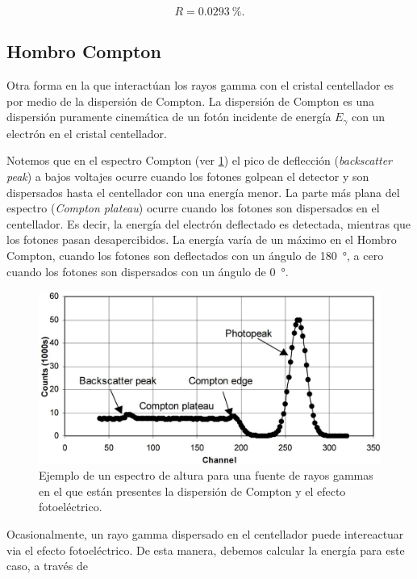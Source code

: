 \documentclass[12pt]{article}
\begin{document}
    \begin{equation*}
        R = \qty{0.0293}{\percent}.
    \end{equation*}

    \subsection*{Hombro Compton}

    Otra forma en la que interactúan los rayos gamma con el cristal centellador es por medio de la dispersión de Compton. La dispersión de Compton es una dispersión puramente cinemática de un fotón incidente de energía \(E_{\gamma}\) con un electrón en el cristal centellador.

    Notemos que en el espectro Compton (ver \cref{fig:comptonSpectrum}) el pico de deflección (\emph{backscatter peak}) a bajos voltajes ocurre cuando los fotones golpean el detector y son dispersados hasta el centellador con una energía menor. La parte más plana del espectro (\emph{Compton plateau}) ocurre cuando los fotones son dispersados en el centellador. Es decir, la energía del electrón deflectado es detectada, mientras que los fotones pasan desapercibidos. La energía varía de un máximo en el Hombro Compton, cuando los fotones son deflectados con un ángulo de \qty{180}{\degree}, a cero cuando los fotones son dispersados con un ángulo de \qty{0}{\degree}.

    \begin{figure}[!htb]
        \centering
        \includegraphics{compton_spectrum.jpg}
        \caption{Ejemplo de un espectro de altura para una fuente de rayos gammas en el que están presentes la dispersión de Compton y el efecto fotoeléctrico.\cite{gammaSpectroscopy}}
        \label{fig:comptonSpectrum}
    \end{figure}

    Ocasionalmente, un rayo gamma dispersado en el centellador puede intereactuar via el efecto fotoeléctrico. De esta manera, debemos calcular la energía para este caso, a través de
\end{document}
